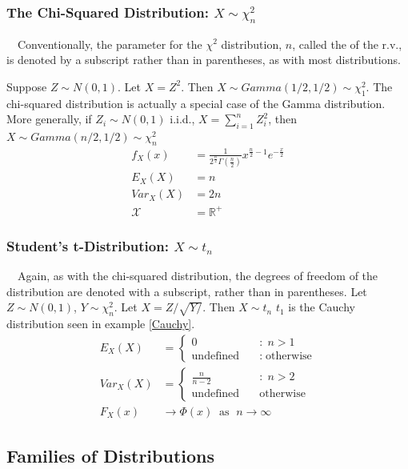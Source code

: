 \documentclass[12pt,a4paper]{article}
\newcommand{\uline}[1]{\underline{\smash{#1}}}
\begin{document}
\subsubsection{The Chi-Squared Distribution: $X \sim \chi^2_n$}

$\quad$Conventionally, the parameter for the $\chi^2$ distribution, $n$, called the \uline{degrees of freedom} of the r.v., is denoted by a subscript rather than in parentheses, as with most distributions.

Suppose $Z \sim N(0,1)$. Let $X = Z^2$. Then $X \sim Gamma(1\!/\!2,1\!/\!2) \sim \chi^2_1$. The chi-squared distribution is actually a special case of the Gamma distribution. More generally, if $Z_i \sim N(0,1)$ i.i.d., $X = \sum\limits_{i=1}^n Z_i^2$, then $X \sim Gamma(n\!/\!2,1\!/\!2) \sim \chi^2_n$
\begin{align*}
f_X(x) &= \frac{1}{2^{\frac{n}{2}}\Gamma\left(\frac{n}{2}\right)} x^{\frac{n}{2}-1}e^{-\frac{x}{2}}\\
E_{X}(X) &= n\\
Var_{X}(X) &= 2n\\
\mathcal{X} &= \mathbb{R}^+
\end{align*}

\subsubsection{Student's t-Distribution: $ X \sim t_n$}

$\quad$Again, as with the chi-squared distribution, the degrees of freedom of the distribution are denoted with a subscript, rather than in parentheses. Let $Z \sim N(0,1)$, $Y \sim \chi^2_n$. Let $X = Z/\sqrt{Y/}$. Then $X \sim t_n$ $t_1$ is the Cauchy distribution seen in example \ref{Cauchy}.
\begin{align*}
E_{X}(X) &= \left\{ \begin{array}{cl} 0 \quad& : \; n > 1\\ \mbox{undefined}\quad& : \; \mbox{otherwise}\end{array}\right.\\
Var_{X}(X) &= \left\{\begin{array}{cl} \frac{n}{n-2} \quad& : \; n>2\\ \mbox{undefined}\quad& \mbox{otherwise}\end{array}\right.\\
F_X(x) &\rightarrow \Phi(x) \;\; \text{as }\; n\rightarrow \infty
\end{align*}

\subsection{Families of Distributions}$\;$
\end{document}
